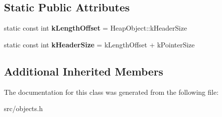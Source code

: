 \subsection*{Static Public Attributes}
\begin{DoxyCompactItemize}
\item 
\hypertarget{classv8_1_1internal_1_1_fixed_array_base_a3ef7eb2b8624eacb7386592f0d0e3412}{}static const int {\bfseries k\+Length\+Offset} = Heap\+Object\+::k\+Header\+Size\label{classv8_1_1internal_1_1_fixed_array_base_a3ef7eb2b8624eacb7386592f0d0e3412}

\item 
\hypertarget{classv8_1_1internal_1_1_fixed_array_base_a9cdeef0942628b14b8ec523e8898b6d1}{}static const int {\bfseries k\+Header\+Size} = k\+Length\+Offset + k\+Pointer\+Size\label{classv8_1_1internal_1_1_fixed_array_base_a9cdeef0942628b14b8ec523e8898b6d1}

\end{DoxyCompactItemize}
\subsection*{Additional Inherited Members}


The documentation for this class was generated from the following file\+:\begin{DoxyCompactItemize}
\item 
src/objects.\+h\end{DoxyCompactItemize}
